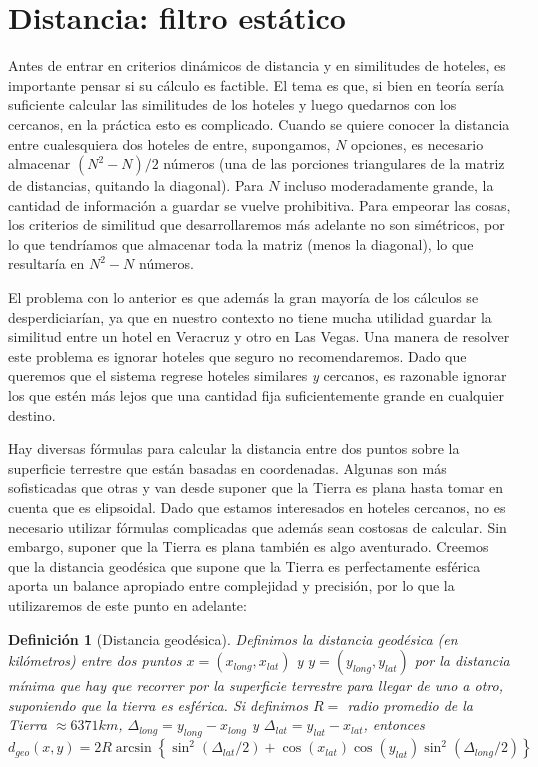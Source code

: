 \documentclass[12pt]{report}
\newtheorem{defn}{Definici\'on}[chapter]
\begin{document}
\section{Distancia: filtro estático}

Antes de entrar en criterios dinámicos de distancia y en similitudes de hoteles, es importante pensar si su cálculo es factible. El tema es que, si bien en teoría sería suficiente calcular las similitudes de los hoteles y luego quedarnos con los cercanos, en la práctica esto es complicado. Cuando se quiere conocer la distancia entre cualesquiera dos hoteles de entre, supongamos, $N$ opciones, es necesario almacenar $(N^2 - N)/2$ números (una de las porciones triangulares de la matriz de distancias, quitando la diagonal). Para $N$ incluso moderadamente grande, la cantidad de información a guardar se vuelve prohibitiva. Para empeorar las cosas, los criterios de similitud que desarrollaremos más adelante no son simétricos, por lo que tendríamos que almacenar toda la matriz (menos la diagonal), lo que resultaría en $N^2 - N$ números.

El problema con lo anterior es que además la gran mayoría de los cálculos se desperdiciarían, ya que en nuestro contexto no tiene mucha utilidad guardar la similitud entre un hotel en Veracruz y otro en Las Vegas. Una manera de resolver este problema es ignorar hoteles que seguro no recomendaremos. Dado que queremos que el sistema regrese hoteles similares \emph{y} cercanos, es razonable ignorar los que estén más lejos que una cantidad fija suficientemente grande en cualquier destino.

Hay diversas fórmulas para calcular la distancia entre dos puntos sobre la superficie terrestre que están basadas en coordenadas. Algunas son más sofisticadas que otras y van desde suponer que la Tierra es plana hasta tomar en cuenta que es elipsoidal. Dado que estamos interesados en hoteles cercanos, no es necesario utilizar fórmulas complicadas que además sean costosas de calcular. Sin embargo, suponer que la Tierra es plana también es algo aventurado. Creemos que la distancia geodésica que supone que la Tierra es perfectamente esférica aporta un balance apropiado entre complejidad y precisión, por lo que la utilizaremos de este punto en adelante:
\begin{defn}[Distancia geodésica]
Definimos la distancia geodésica (en kilómetros) entre dos puntos $x = (x_{long}, x_{lat})$ y $y = (y_{long}, y_{lat})$ por la distancia mínima que hay que recorrer por la superficie terrestre para llegar de uno a otro, suponiendo que la tierra es esférica. Si definimos $R =$ radio promedio de la Tierra $\approx 6371 km$, $\Delta_{long} = y_{long} - x_{long}$ y $\Delta_{lat} = y_{lat} - x_{lat}$, entonces
\[
d_{geo}(x,y) = 2 R \arcsin\left\{\sin^2(\Delta_{lat}/2) + \cos(x_{lat}) \cos(y_{lat}) \sin^2(\Delta_{long}/2) \right\}
\]
\end{defn}
\end{document}
